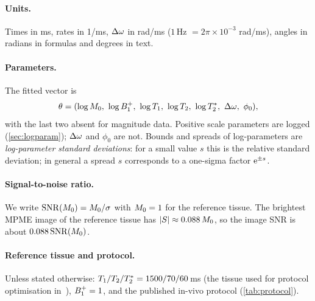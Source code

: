 \paragraph{Units.} Times in ms, rates in 1/ms, $\Delta\omega$ in rad/ms ($1$\,Hz $=2\pi\times10^{-3}$
rad/ms), angles in radians in formulas and degrees in text.

\paragraph{Parameters.} The fitted vector is
\begin{equation}
  \theta=(\log\Mzero,\ \log\Bone,\ \log\Tone,\ \log\Ttwo,\ \log\Ttwos,\ \dw,\ \phi_0),
\end{equation}
with the last two absent for magnitude data. Positive scale parameters are logged
(\cref{sec:logparam}); $\Delta\omega$ and $\phi_0$ are not. Bounds and spreads of log-parameters are
\emph{log-parameter standard deviations}: for a small value $s$ this is the relative
standard deviation; in general a spread $s$ corresponds to a one-sigma factor $\mathrm{e}^{\pm s}$.

\paragraph{Signal-to-noise ratio.} We write $\mathrm{SNR}(M_0)=M_0/\sigma$ with
$M_0=1$ for the reference tissue. The brightest MPME image of the reference tissue has
$|S|\approx0.088\,M_0$, so the image SNR is about $0.088\,\mathrm{SNR}(M_0)$.

\paragraph{Reference tissue and protocol.} Unless stated otherwise: $T_1/T_2/T_2^{*}=
1500/70/60$\,ms (the tissue used for protocol optimisation in~\cite{cheng2019}), $B_1^{+}=1$,
and the published in-vivo protocol (\cref{tab:protocol}).
